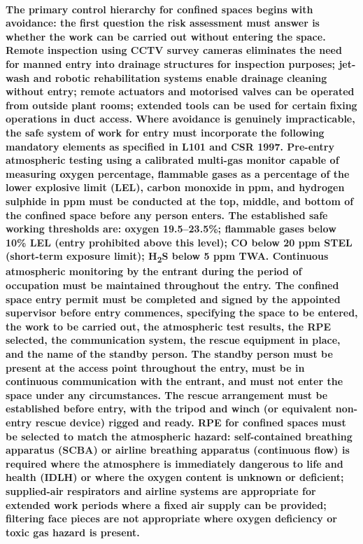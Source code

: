 \paragraph{The primary control hierarchy for confined spaces begins with avoidance: the first question the risk assessment must answer is whether the work can be carried out without entering the space. Remote inspection using CCTV survey cameras eliminates the need for manned entry into drainage structures for inspection purposes; jet-wash and robotic rehabilitation systems enable drainage cleaning without entry; remote actuators and motorised valves can be operated from outside plant rooms; extended tools can be used for certain fixing operations in duct access. Where avoidance is genuinely impracticable, the safe system of work for entry must incorporate the following mandatory elements as specified in L101 and CSR 1997. Pre-entry atmospheric testing using a calibrated multi-gas monitor capable of measuring oxygen percentage, flammable gases as a percentage of the lower explosive limit (LEL), carbon monoxide in ppm, and hydrogen sulphide in ppm must be conducted at the top, middle, and bottom of the confined space before any person enters. The established safe working thresholds are: oxygen 19.5--23.5\%; flammable gases below 10\% LEL (entry prohibited above this level); CO below 20 ppm STEL (short-term exposure limit); H\textsubscript{2}S below 5 ppm TWA. Continuous atmospheric monitoring by the entrant during the period of occupation must be maintained throughout the entry. The confined space entry permit must be completed and signed by the appointed supervisor before entry commences, specifying the space to be entered, the work to be carried out, the atmospheric test results, the RPE selected, the communication system, the rescue equipment in place, and the name of the standby person. The standby person must be present at the access point throughout the entry, must be in continuous communication with the entrant, and must not enter the space under any circumstances. The rescue arrangement must be established before entry, with the tripod and winch (or equivalent non-entry rescue device) rigged and ready. RPE for confined spaces must be selected to match the atmospheric hazard: self-contained breathing apparatus (SCBA) or airline breathing apparatus (continuous flow) is required where the atmosphere is immediately dangerous to life and health (IDLH) or where the oxygen content is unknown or deficient; supplied-air respirators and airline systems are appropriate for extended work periods where a fixed air supply can be provided; filtering face pieces are not appropriate where oxygen deficiency or toxic gas hazard is present.}

